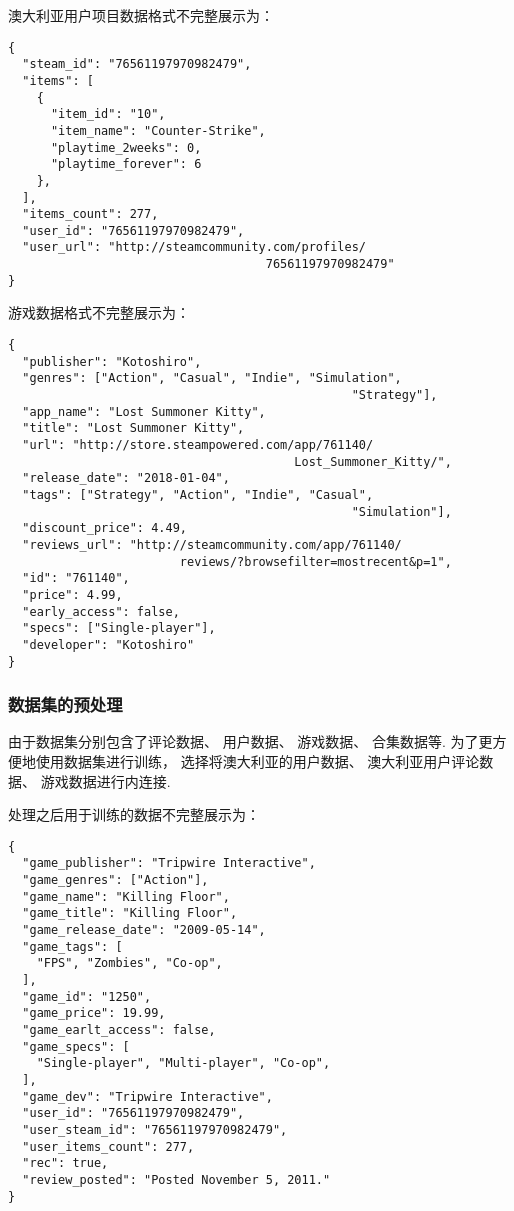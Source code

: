澳大利亚用户项目数据格式不完整展示为：
\begin{verbatim}
{
  "steam_id": "76561197970982479",
  "items": [
    {
      "item_id": "10",
      "item_name": "Counter-Strike",
      "playtime_2weeks": 0,
      "playtime_forever": 6
    },
  ],
  "items_count": 277,
  "user_id": "76561197970982479",
  "user_url": "http://steamcommunity.com/profiles/
                                    76561197970982479"
}
\end{verbatim}

游戏数据格式不完整展示为：
\begin{verbatim}
{
  "publisher": "Kotoshiro",
  "genres": ["Action", "Casual", "Indie", "Simulation", 
                                                "Strategy"],
  "app_name": "Lost Summoner Kitty",
  "title": "Lost Summoner Kitty",
  "url": "http://store.steampowered.com/app/761140/
                                        Lost_Summoner_Kitty/",
  "release_date": "2018-01-04",
  "tags": ["Strategy", "Action", "Indie", "Casual", 
                                                "Simulation"],
  "discount_price": 4.49,
  "reviews_url": "http://steamcommunity.com/app/761140/
                        reviews/?browsefilter=mostrecent&p=1",
  "id": "761140",
  "price": 4.99,
  "early_access": false,
  "specs": ["Single-player"],
  "developer": "Kotoshiro"
}
\end{verbatim}

\subsubsection{数据集的预处理}

由于数据集分别包含了评论数据、
用户数据、
游戏数据、
合集数据等.
为了更方便地使用数据集进行训练，
选择将澳大利亚的用户数据、
澳大利亚用户评论数据、
游戏数据进行内连接.

处理之后用于训练的数据不完整展示为：
\begin{verbatim}
{
  "game_publisher": "Tripwire Interactive",
  "game_genres": ["Action"],
  "game_name": "Killing Floor",
  "game_title": "Killing Floor",
  "game_release_date": "2009-05-14",
  "game_tags": [
    "FPS", "Zombies", "Co-op",
  ],
  "game_id": "1250",
  "game_price": 19.99,
  "game_earlt_access": false,
  "game_specs": [
    "Single-player", "Multi-player", "Co-op",
  ],
  "game_dev": "Tripwire Interactive",
  "user_id": "76561197970982479",
  "user_steam_id": "76561197970982479",
  "user_items_count": 277,
  "rec": true,
  "review_posted": "Posted November 5, 2011."
}
\end{verbatim}

